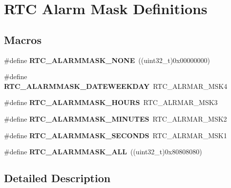 \hypertarget{group___r_t_c___alarm_mask___definitions}{}\section{R\+TC Alarm Mask Definitions}
\label{group___r_t_c___alarm_mask___definitions}
\subsection*{Macros}
\begin{DoxyCompactItemize}
\item 
\#define {\bfseries R\+T\+C\+\_\+\+A\+L\+A\+R\+M\+M\+A\+S\+K\+\_\+\+N\+O\+NE}~((uint32\+\_\+t)0x00000000)\hypertarget{group___r_t_c___alarm_mask___definitions_ga051c19c4a3c3f12bcf672f35d03254ae}{}\label{group___r_t_c___alarm_mask___definitions_ga051c19c4a3c3f12bcf672f35d03254ae}

\item 
\#define {\bfseries R\+T\+C\+\_\+\+A\+L\+A\+R\+M\+M\+A\+S\+K\+\_\+\+D\+A\+T\+E\+W\+E\+E\+K\+D\+AY}~R\+T\+C\+\_\+\+A\+L\+R\+M\+A\+R\+\_\+\+M\+S\+K4\hypertarget{group___r_t_c___alarm_mask___definitions_ga0bcc63ed1fe29a90fa8745cd3b98f73c}{}\label{group___r_t_c___alarm_mask___definitions_ga0bcc63ed1fe29a90fa8745cd3b98f73c}

\item 
\#define {\bfseries R\+T\+C\+\_\+\+A\+L\+A\+R\+M\+M\+A\+S\+K\+\_\+\+H\+O\+U\+RS}~R\+T\+C\+\_\+\+A\+L\+R\+M\+A\+R\+\_\+\+M\+S\+K3\hypertarget{group___r_t_c___alarm_mask___definitions_gaa8bfd0f98f4f53930a34a43af093af37}{}\label{group___r_t_c___alarm_mask___definitions_gaa8bfd0f98f4f53930a34a43af093af37}

\item 
\#define {\bfseries R\+T\+C\+\_\+\+A\+L\+A\+R\+M\+M\+A\+S\+K\+\_\+\+M\+I\+N\+U\+T\+ES}~R\+T\+C\+\_\+\+A\+L\+R\+M\+A\+R\+\_\+\+M\+S\+K2\hypertarget{group___r_t_c___alarm_mask___definitions_gafe9215f55d86f2f959af686539c5aa0a}{}\label{group___r_t_c___alarm_mask___definitions_gafe9215f55d86f2f959af686539c5aa0a}

\item 
\#define {\bfseries R\+T\+C\+\_\+\+A\+L\+A\+R\+M\+M\+A\+S\+K\+\_\+\+S\+E\+C\+O\+N\+DS}~R\+T\+C\+\_\+\+A\+L\+R\+M\+A\+R\+\_\+\+M\+S\+K1\hypertarget{group___r_t_c___alarm_mask___definitions_gad404276351a285f7ede5a1ec53009353}{}\label{group___r_t_c___alarm_mask___definitions_gad404276351a285f7ede5a1ec53009353}

\item 
\#define {\bfseries R\+T\+C\+\_\+\+A\+L\+A\+R\+M\+M\+A\+S\+K\+\_\+\+A\+LL}~((uint32\+\_\+t)0x80808080)\hypertarget{group___r_t_c___alarm_mask___definitions_gae5a5dc7b33c51c572ebc9cb58723fdd3}{}\label{group___r_t_c___alarm_mask___definitions_gae5a5dc7b33c51c572ebc9cb58723fdd3}

\end{DoxyCompactItemize}


\subsection{Detailed Description}
